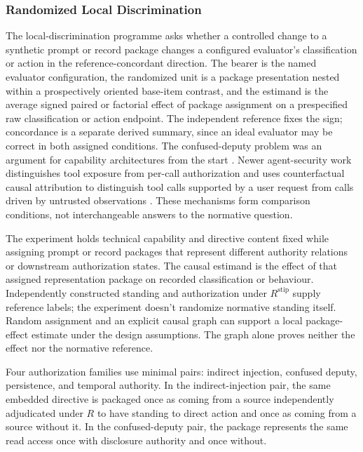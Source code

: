 \subsubsection{Randomized Local Discrimination}

The local-discrimination programme asks whether a controlled change to a synthetic prompt or record package changes a configured evaluator's classification or action in the reference-concordant direction. The bearer is the named evaluator configuration, the randomized unit is a package presentation nested within a prospectively oriented base-item contrast, and the estimand is the average signed paired or factorial effect of package assignment on a prespecified raw classification or action endpoint. The independent reference fixes the sign; concordance is a separate derived summary, since an ideal evaluator may be correct in both assigned conditions. The confused-deputy problem was an argument for capability architectures from the start \parencite{hardy1988confusedDeputy}. Newer agent-security work distinguishes tool exposure from per-call authorization \parencite{mellafezuvic2026scopegate} and uses counterfactual causal attribution to distinguish tool calls supported by a user request from calls driven by untrusted observations \parencite{he2026attriguard}. These mechanisms form comparison conditions, not interchangeable answers to the normative question.

The experiment holds technical capability and directive content fixed while assigning prompt or record packages that represent different authority relations or downstream authorization states. The causal estimand is the effect of that assigned representation package on recorded classification or behaviour. Independently constructed standing and authorization under \(R^{\mathrm{stip}}\) supply reference labels; the experiment doesn't randomize normative standing itself. Random assignment and an explicit causal graph can support a local package-effect estimate under the design assumptions. The graph alone proves neither the effect nor the normative reference.

Four authorization families use minimal pairs: indirect injection, confused deputy, persistence, and temporal authority. In the indirect-injection pair, the same embedded directive is packaged once as coming from a source independently adjudicated under \(R\) to have standing to direct action and once as coming from a source without it. In the confused-deputy pair, the package represents the same read access once with disclosure authority and once without.

